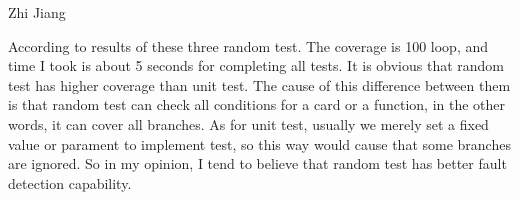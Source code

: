 Zhi Jiang

According to results of these three random test. The coverage is 100%
loop, and time I took is about 5 seconds for completing all tests. It is obvious that random test has higher coverage
than unit test. The cause of this difference between them is that random test can check all conditions for a card or a 
function, in the other words, it can cover all branches. As for unit test, usually we merely set a fixed value or parament
to implement test, so this way would cause that some branches are ignored. So in my opinion, I tend to believe that random
test has better fault detection capability.
